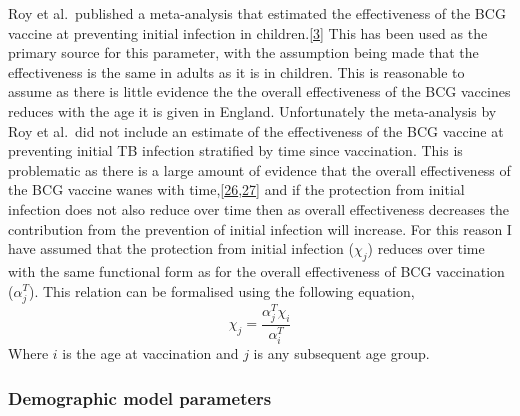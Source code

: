 \documentclass[11pt,twoside]{bristolthesis}
\begin{document}
  Roy et al.~published a meta-analysis that estimated the effectiveness of the BCG vaccine at preventing initial infection in children.{[}\protect\hyperlink{ref-Roy2014}{3}{]} This has been used as the primary source for this parameter, with the assumption being made that the effectiveness is the same in adults as it is in children. This is reasonable to assume as there is little evidence the the overall effectiveness of the BCG vaccines reduces with the age it is given in England. Unfortunately the meta-analysis by Roy et al.~did not include an estimate of the effectiveness of the BCG vaccine at preventing initial TB infection stratified by time since vaccination. This is problematic as there is a large amount of evidence that the overall effectiveness of the BCG vaccine wanes with time,{[}\protect\hyperlink{ref-Abubakar2013}{26},\protect\hyperlink{ref-Mangtani2017}{27}{]} and if the protection from initial infection does not also reduce over time then as overall effectiveness decreases the contribution from the prevention of initial infection will increase. For this reason I have assumed that the protection from initial infection (\(\chi_j\)) reduces over time with the same functional form as for the overall effectiveness of BCG vaccination (\(\alpha^T_j\)). This relation can be formalised using the following equation,
  \begin{equation}
    \chi_j = \frac{\alpha^T_j\chi_i}{\alpha^T_i}
    \label{eq:fun-prev-initial-inf}
  \end{equation}
  Where \(i\) is the age at vaccination and \(j\) is any subsequent age group.
  
  \hypertarget{demo-model-parameters}{%
  \subsubsection{Demographic model parameters}\label{demo-model-parameters}}
  
\end{document}
